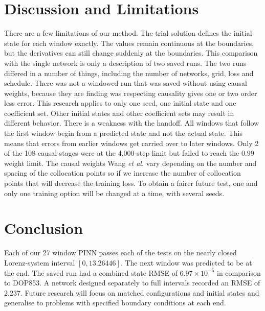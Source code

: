 \documentclass[conference]{IEEEtran}
\begin{document}
\section{Discussion and Limitations}
There are a few limitations of our method. The trial solution \cite{lagaris1998} defines the initial state for each window exactly. The values remain continuous at the boundaries, but the derivatives can still change suddenly at the boundaries. This comparison with the single network is only a description of two saved runs. The two runs differed in a number of things, including the number of networks, grid, loss and schedule. There was not a windowed run that was saved without using causal weights, because \cite{wang2024causal} they are finding was respecting causality gives one or two order less error. This research applies to only one seed, one initial state and one coefficient set. Other initial states and other coefficient sets may result in different behavior. There is a weakness with the handoff. All windows that follow the first window begin from a predicted state and not the actual state. This means that errors from earlier windows get carried over to later windows. Only 2 of the 108 causal stages were at the 4,000-step limit but failed to reach the $0.99$ weight limit. The causal weights Wang \emph{et al.} vary depending on the number and spacing of the collocation points so if we increase the number of collocation points that will decrease the training loss. To obtain a fairer future test, one and only one training option will be changed at a time, with several seeds.

\section{Conclusion}



Each of our 27 window PINN passes each of the tests on the nearly closed Lorenz-system interval $[0,13.26446]$. The next window was predicted to be at the end. The saved run had a combined state RMSE of $6.97\times10^{-5}$ in comparison to DOP853. A network designed separately to full intervals recorded an RMSE of 2.237. Future research will focus on matched configurations and initial states and generalise to problems with specified boundary conditions at each end.










\end{document}
